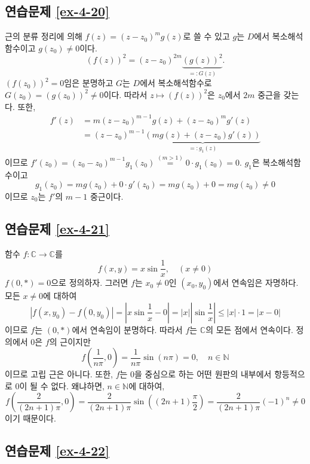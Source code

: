 \subsection*{연습문제 \ref{ex-4-20}}

근의 분류 정리에 의해 $f(z)=(z-z_0)^m g(z)$로 쓸 수 있고
$g$는 $D$에서 복소해석함수이고 $g(z_0)\ne0$이다.
\[
\left( f(z) \right)^2 = (z-z_0)^{2m} 
\underbrace{ \left( g(z) \right)^2}_{=:G(z)}.
\]
$(f(z_0))^2=0$임은 분명하고 $G$는 $D$에서 복소해석함수로 
$G(z_0) = (g(z_0))^2 \ne 0$이다.
따라서 $z\mapsto (f(z))^2$은 $z_0$에서 $2m$ 중근을 갖는다.
또한,
\begin{align*}
f'(z) &= m(z-z_0)^{m-1} g(z) + (z-z_0)^m g'(z) \\
&= (z-z_0)^{m-1} \underbrace{(mg(z) + (z-z_0)g'(z))}_{=:g_1(z)}
\end{align*}
이므로 $f'(z_0) = (z_0 - z_0)^{m-1}g_1(z_0) \stackrel{(m>1)}{=}
0\cdot g_1(z_0) = 0$.
$g_1$은 복소해석함수이고 
\[
g_1(z_0) = mg(z_0) + 0\cdot g'(z_0) = mg(z_0) + 0 = mg(z_0) \ne 0
\]
이므로 $z_0$는 $f'$의 $m-1$ 중근이다.

\subsection*{연습문제 \ref{ex-4-21}}

함수 $f:\mathbb C \to \mathbb C$를
\[
f(x,y) = x\sin \dfrac1x, \quad (x\ne0)
\]
$f(0,*)=0$으로 정의하자.
그러면 $f$는 $x_0\ne0$인 $(x_0, y_0)$에서 연속임은 자명하다.
모든 $x\ne0$에 대하여
\[
|f(x,y_0) - f(0,y_0)|= \left| x\sin \dfrac1x - 0\right| = |x| \left| \sin \dfrac 1x \right|
\le |x| \cdot 1 = |x-0|
\]
이므로 $f$는 $(0,*)$에서 연속임이 분명하다.
따라서 $f$는 $\mathbb C$의 모든 점에서 연속이다.
정의에서 $0$은 $f$의 근이지만 
\[
f\left( \dfrac1{n\pi}, 0\right) = \dfrac1{n\pi} \sin(n\pi) = 0, \quad n\in\mathbb N
\]
이므로 고립 근은 아니다.
또한, $f$는 $0$을 중심으로 하는 어떤 원판의 내부에서 항등적으로 $0$이 될 수 없다.
왜냐하면, $n\in\mathbb N$에 대하여,
\[
f\left( \dfrac2{(2n+1)\pi}, 0\right) 
= \dfrac2{(2n+1)\pi}\sin\left((2n+1)\dfrac\pi2 \right) 
=\dfrac2{(2n+1)\pi}(-1)^n \ne0
\]
이기 때문이다.

\subsection*{연습문제 \ref{ex-4-22}}

